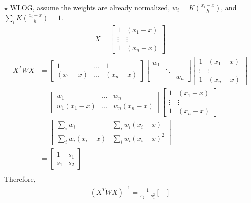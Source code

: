 \documentclass[11pt]{article}
\newcommand{\jie}{$\star$ }
\begin{document}
\begin{enumerate}[(A)]
\bigskip \jie
WLOG, assume the weights are already normalized, $w_i = K (\frac{x_i - x}{h})$, and $\sum_i K (\frac{x_i - x}{h}) = 1$.
\begin{align*}
    X = \begin{bmatrix}
    1 & (x_1 - x) \\
    \vdots & \vdots \\
    1 & (x_n - x)
    \end{bmatrix}
\end{align*}
\begin{align*}
    X^T W X &= \begin{bmatrix}
    1 & \dots & 1 \\
    (x_1 -x) & \dots & (x_n - x)
    \end{bmatrix}
    \begin{bmatrix}
    w_1 & & \\
    & \ddots & \\
    & & w_n
    \end{bmatrix}
    \begin{bmatrix}
    1 & (x_1 - x) \\
    \vdots & \vdots \\
    1 & (x_n - x)
    \end{bmatrix} \\
    & = \begin{bmatrix}
    w_1 & \dots & w_n \\
    w_1(x_1 -x) & \dots & w_n(x_n - x)
    \end{bmatrix}
    \begin{bmatrix}
    1 & (x_1 - x) \\
    \vdots & \vdots \\
    1 & (x_n - x)
    \end{bmatrix} \\
    &= \begin{bmatrix}
    \sum_i w_i & \sum_i w_i (x_i - x) \\
    \sum_i w_i (x_i - x) & \sum_i w_i (x_i - x)^2
    \end{bmatrix} \\
    &= \begin{bmatrix}
    1 & s_1 \\
    s_1 & s_2
    \end{bmatrix} \\
\end{align*}
Therefore,
\begin{align*}
    (X^T W X)^{-1} = \frac{1}{s_2 - s_1^2} 
    \begin{bmatrix}

\end{bmatrix}
\end{align*}
\end{enumerate}
\end{document}
